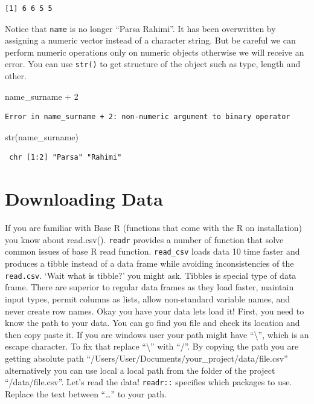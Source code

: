 \documentclass[
  letterpaper,
]{book}
\newenvironment{Shaded}{\begin{snugshade}}{\end{snugshade}}
\newcommand{\DecValTok}[1]{\textcolor[rgb]{0.68,0.00,0.00}{#1}}
\newcommand{\FunctionTok}[1]{\textcolor[rgb]{0.28,0.35,0.67}{#1}}
\newcommand{\NormalTok}[1]{\textcolor[rgb]{0.00,0.23,0.31}{#1}}
\newcommand{\SpecialCharTok}[1]{\textcolor[rgb]{0.37,0.37,0.37}{#1}}
\begin{document}
\begin{verbatim}
[1] 6 6 5 5
\end{verbatim}

Notice that \texttt{name} is no longer ``Parsa Rahimi''. It has been
overwritten by assigning a numeric vector instead of a character string.
But be careful we can perform numeric operations only on numeric objects
otherwise we will receive an error. You can use \texttt{str()} to get
structure of the object such as type, length and other.

\begin{Shaded}
\begin{Highlighting}[]
\NormalTok{name\_surname }\SpecialCharTok{+} \DecValTok{2}
\end{Highlighting}
\end{Shaded}

\begin{verbatim}
Error in name_surname + 2: non-numeric argument to binary operator
\end{verbatim}

\begin{Shaded}
\begin{Highlighting}[]
\FunctionTok{str}\NormalTok{(name\_surname)}
\end{Highlighting}
\end{Shaded}

\begin{verbatim}
 chr [1:2] "Parsa" "Rahimi"
\end{verbatim}

\hypertarget{downloading-data}{%
\section{Downloading Data}\label{downloading-data}}

If you are familiar with Base R (functions that come with the R on
installation) you know about read.csv(). \texttt{readr} provides a
number of function that solve common issues of base R read function.
\texttt{read\_csv} loads data 10 time faster and produces a tibble
instead of a data frame while avoiding inconsistencies of the
\texttt{read.csv}. `Wait what is tibble?' you might ask. Tibbles is
special type of data frame. There are superior to regular data frames as
they load faster, maintain input types, permit columns as lists, allow
non-standard variable names, and never create row names. Okay you have
your data lets load it! First, you need to know the path to your data.
You can go find you file and check its location and then copy paste it.
If you are windows user your path might have ``\textbackslash{}'', which
is an escape character. To fix that replace ``\textbackslash{}'' with
``/''. By copying the path you are getting absolute path
``/Users/User/Documents/your\_project/data/file.csv'' alternatively you
can use local a local path from the folder of the project
``/data/file.csv''. Let's read the data! \texttt{readr::} specifies
which packages to use. Replace the text between ``\ldots{}'' to your
path.
\end{document}
